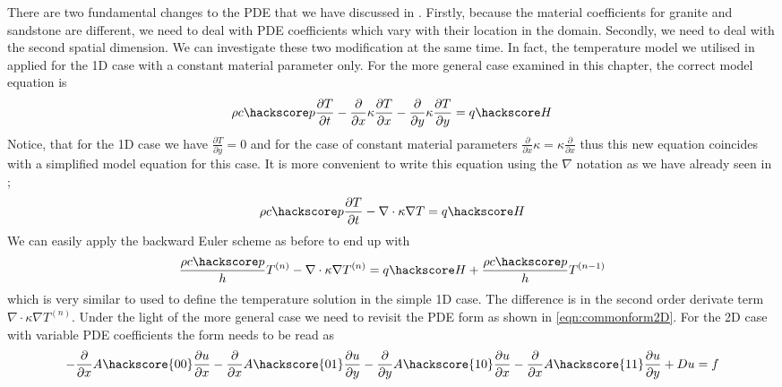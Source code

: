 There are two fundamental changes to the PDE that we have discussed in . Firstly,
because the material coefficients for granite and sandstone are different, we need to deal with 
PDE coefficients which vary with their location in the domain. Secondly, we need 
to deal with the second spatial dimension. We can investigate these two modification at the same time. 
In fact, the temperature model  we utilised in  applied for the 
1D case with a constant material parameter only. For the more general case examined in this chapter, the correct model equation is 
\begin{equation}
\rho c\hackscore p \frac{\partial T}{\partial t} -  \frac{\partial }{\partial x} \kappa \frac{\partial T}{\partial x} -  \frac{\partial }{\partial y} \kappa \frac{\partial T}{\partial y} = q\hackscore H 
\label{eqn:hd2}
\end{equation}
Notice, that for the 1D case we have $\frac{\partial T}{\partial y}=0$ and
for the case of constant material parameters $\frac{\partial }{\partial x} \kappa = \kappa  \frac{\partial }{\partial x}$ thus this new equation coincides with a simplified model equation for this case. It is more convenient 
to write this equation using the $\nabla$ notation as we have already seen in ;
\begin{equation}\label{eqn:Tform nabla}
\rho c\hackscore p \frac{\partial T}{\partial t} 
-\nabla \cdot \kappa \nabla T = q\hackscore H
\end{equation}
We can easily apply the backward Euler scheme as before to end up with 
\begin{equation}
\frac{\rho c\hackscore p}{h} T^{(n)} -\nabla \cdot \kappa \nabla T^{(n)}  = q\hackscore H +  \frac{\rho c\hackscore p}{h} T^{(n-1)}
\label{eqn:hdgenf2}
\end{equation}
which is very similar to  used to define the temperature solution in the simple 1D case. 
The difference is in the second order derivate term $\nabla \cdot \kappa \nabla T^{(n)}$. Under 
the light of the more general case we need to revisit the \esc PDE form as 
shown in \ref{eqn:commonform2D}. For the 2D case with variable PDE coefficients 
the form needs to be read as 
\begin{equation}\label{eqn:commonform2D 2}
-\frac{\partial }{\partial x} A\hackscore{00}\frac{\partial u}{\partial x} 
-\frac{\partial }{\partial x} A\hackscore{01}\frac{\partial u}{\partial y} 
-\frac{\partial }{\partial y} A\hackscore{10}\frac{\partial u}{\partial x} 
-\frac{\partial }{\partial x} A\hackscore{11}\frac{\partial u}{\partial y} 
+ Du = f
\end{equation}
